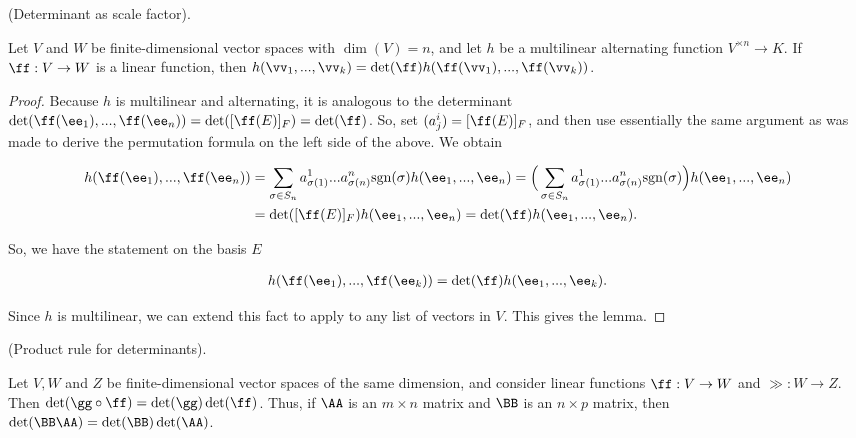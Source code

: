 \begin{lemma}
\label{ch::lin_alg::lemma:det_as_scale_factor}
    (Determinant as scale factor).

    Let $V$ and $W$ be finite-dimensional vector spaces with $\dim(V) = n$, and let $h$ be a multilinear alternating function $V^{\times n} \rightarrow K$. If $\ff:V \rightarrow W$ is a linear function, then $h(\vv_1, ..., \vv_k) = \det(\ff) h(\ff(\vv_1), ..., \ff(\vv_k))$.
\end{lemma}

\begin{proof}
     Because $h$ is multilinear and alternating, it is analogous to the determinant $\det(\ff(\ee_1), ..., \ff(\ee_n)) = \det([\ff(E)]_F) = \det(\ff)$. So, set $(a^i_j) = [\ff(E)]_F$, and then use essentially the same argument as was made to derive the permutation formula on the left side of the above. We obtain
    
    \begin{align*}
        h(\ff(\ee_1), ...,
        \ff(\ee_n)) 
        &= \sum_{\sigma \in S_n} a^1_{\sigma(1)} ... a^n_{\sigma(n)} \sgn(\sigma) h(\ee_1, ..., \ee_n)
        = \Big( \sum_{\sigma \in S_n} a^1_{\sigma(1)} ... a^n_{\sigma(n)} \sgn(\sigma) \Big) h(\ee_1, ..., \ee_n) \\
        &= \det([\ff(E)]_F) h(\ee_1, ..., \ee_n)
        = \det(\ff) h(\ee_1, ..., \ee_n).
    \end{align*}
    
   So, we have the statement on the basis $E$
   
   \begin{align*}
        h(\ff(\ee_1), ..., 
        \ff(\ee_k)) = \det(\ff) h(\ee_1, ..., \ee_k).
   \end{align*}
   
   Since $h$ is multilinear, we can extend this fact to apply to any list of vectors in $V$. This gives the lemma.
\end{proof}

\begin{theorem}
    (Product rule for determinants). 
    
    Let $V, W$ and $Z$ be finite-dimensional vector spaces of the same dimension, and consider linear functions $\ff:V \rightarrow W$ and $\gg:W \rightarrow Z$. Then $\det(\gg \circ \ff) = \det(\gg) \det(\ff)$. Thus, if $\AA$ is an $m \times n$ matrix and $\BB$ is an $n \times p$ matrix, then $\det(\BB \AA) = \det(\BB) \det(\AA)$.
\end{theorem}

